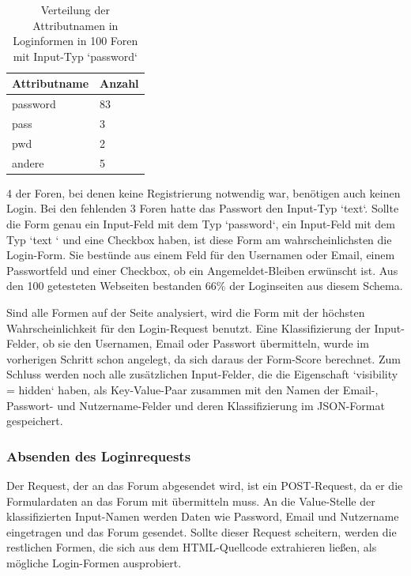 \begin{table}[h!]
\centering 
\begin{tabular}{ | p{3cm} | p{3cm}|} \hline
\textbf{Attributname} & \textbf{Anzahl} \\ \hline
password & 83 \\ \hline
pass & 3 \\ \hline
pwd & 2 \\ \hline
andere & 5 \\ \hline
\end{tabular}
\caption{Verteilung der Attributnamen in Loginformen in 100 Foren mit Input-Typ `password`}
\end{table}

4 der Foren, bei denen keine Registrierung notwendig war, benötigen auch keinen Login. Bei den fehlenden 3 Foren hatte das Passwort den Input-Typ `text`.
Sollte die Form genau ein Input-Feld mit dem Typ `password`, ein Input-Feld mit dem Typ `text ` und eine Checkbox haben, ist diese Form am wahrscheinlichsten die Login-Form. Sie bestünde aus einem Feld für den Usernamen oder Email, einem Passwortfeld und einer Checkbox, ob ein Angemeldet-Bleiben erwünscht ist. Aus den 100 getesteten Webseiten bestanden 66\% der Loginseiten aus diesem Schema.

Sind alle Formen auf der Seite analysiert, wird die Form mit der höchsten Wahrscheinlichkeit für den Login-Request benutzt. Eine Klassifizierung der Input-Felder, ob sie den Usernamen, Email oder Passwort übermitteln, wurde im vorherigen Schritt schon angelegt, da sich daraus der Form-Score berechnet. Zum Schluss werden noch alle zusätzlichen Input-Felder, die die Eigenschaft `visibility = hidden` haben, als Key-Value-Paar zusammen mit den Namen der Email-, Passwort- und Nutzername-Felder und deren Klassifizierung im JSON-Format gespeichert.

\subsubsection{Absenden des Loginrequests}
Der Request, der an das Forum abgesendet wird, ist ein POST-Request, da er die Formulardaten an das Forum mit übermitteln muss.
An die Value-Stelle der klassifizierten Input-Namen werden Daten wie Password, Email und Nutzername eingetragen und das Forum gesendet.
Sollte dieser Request scheitern, werden die restlichen Formen, die sich aus dem HTML-Quellcode extrahieren ließen, als mögliche Login-Formen ausprobiert.

